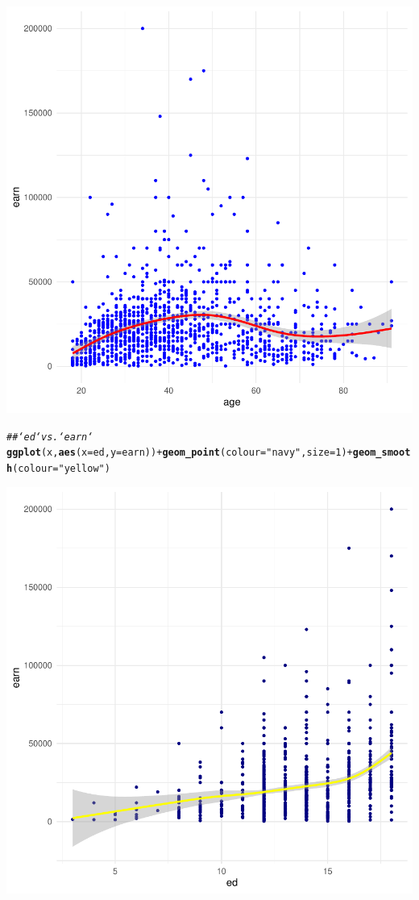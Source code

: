 \documentclass{article}\usepackage[]{graphicx}\usepackage[]{xcolor}
\makeatletter
\newcommand{\hlnum}[1]{\textcolor[rgb]{0.686,0.059,0.569}{#1}}%
\newcommand{\hlstr}[1]{\textcolor[rgb]{0.192,0.494,0.8}{#1}}%
\newcommand{\hlcom}[1]{\textcolor[rgb]{0.678,0.584,0.686}{\textit{#1}}}%
\newcommand{\hlopt}[1]{\textcolor[rgb]{0,0,0}{#1}}%
\newcommand{\hlstd}[1]{\textcolor[rgb]{0.345,0.345,0.345}{#1}}%
\newcommand{\hlkwc}[1]{\textcolor[rgb]{0.333,0.667,0.333}{#1}}%
\newcommand{\hlkwd}[1]{\textcolor[rgb]{0.737,0.353,0.396}{\textbf{#1}}}%
\newenvironment{kframe}{%
 \def\at@end@of@kframe{}%
 \ifinner\ifhmode%
  \def\at@end@of@kframe{\end{minipage}}%
  \begin{minipage}{\columnwidth}%
 \fi\fi%
 \def\FrameCommand##1{\hskip\@totalleftmargin \hskip-\fboxsep
 \colorbox{shadecolor}{##1}\hskip-\fboxsep
     \hskip-\linewidth \hskip-\@totalleftmargin \hskip\columnwidth}%
 \MakeFramed {\advance\hsize-\width
   \@totalleftmargin\z@ \linewidth\hsize
   \@setminipage}}%
 {\par\unskip\endMakeFramed%
 \at@end@of@kframe}
\newenvironment{knitrout}{}{} %
\makeatother
\begin{document}
\begin{knitrout}
{\centering \includegraphics[width=.6\linewidth]{figure/assignment-03-SyversonLuke-Rnwauto-report-5} 

}


\begin{kframe}\begin{alltt}
\hlcom{## `ed` vs. `earn`}
\hlkwd{ggplot}\hlstd{(x,} \hlkwd{aes}\hlstd{(}\hlkwc{x}\hlstd{=ed,} \hlkwc{y}\hlstd{=earn))} \hlopt{+} \hlkwd{geom_point}\hlstd{(}\hlkwc{colour} \hlstd{=} \hlstr{"navy"}\hlstd{,} \hlkwc{size} \hlstd{=} \hlnum{1}\hlstd{)} \hlopt{+} \hlkwd{geom_smooth}\hlstd{(}\hlkwc{colour} \hlstd{=} \hlstr{"yellow"}\hlstd{)}
\end{alltt}


{\ttfamily\noindent\itshape{}}\end{kframe}

{\centering \includegraphics[width=.6\linewidth]{figure/assignment-03-SyversonLuke-Rnwauto-report-6} 

}
\end{knitrout}
\end{document}
